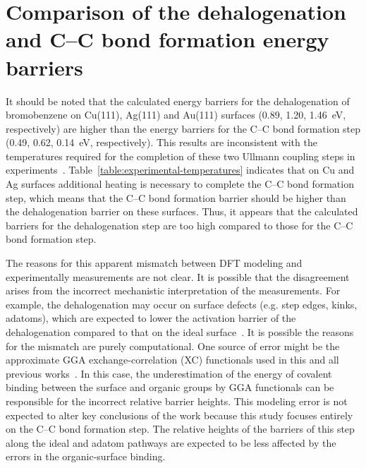 \documentclass[journal=jpclcd,layout=traditional,manuscript=letter]{achemso} %
\begin{document}
\section{Comparison of the dehalogenation and C--C bond formation energy barriers}

It should be noted that the calculated energy barriers for the dehalogenation of bromobenzene on Cu(111), Ag(111) and Au(111) surfaces (0.89, 1.20, \SI{1.46}{\electronvolt}, respectively) are higher than the energy barriers for the C--C bond formation step (0.49, 0.62, \SI{0.14}{\electronvolt}, respectively). This results are inconsistent with the temperatures required for the completion of these two Ullmann coupling steps in experiments~\cite{sur_sci01, sur_sci02, sur_sci03, ullmann_52, ullmann_68, ullmann_69, ullmann_88, ullmann_98}. Table~\ref{table:experimental-temperatures} indicates that on Cu and Ag surfaces additional heating is necessary to complete the C--C bond formation step, which means that the C--C bond formation barrier should be higher than the dehalogenation barrier on these surfaces. Thus, it appears that the calculated barriers for the dehalogenation step are too high compared to those for the C--C bond formation step.

The reasons for this apparent mismatch between DFT modeling and experimentally measurements are not clear. It is possible that the disagreement arises from the incorrect mechanistic interpretation of the measurements. For example, the dehalogenation may occur on surface defects (e.g. step edges, kinks, adatoms), which are expected to lower the activation barrier of the dehalogenation compared to that on the ideal surface~\cite{chemeurope2017}. It is possible the reasons for the mismatch are purely computational. One source of error might be the approximate GGA exchange-correlation (XC) functionals used in this and all previous works~\cite{jacs2013, pccp2010}. In this case, the underestimation of the energy of covalent binding between the surface and organic groups by GGA functionals can be responsible for the incorrect relative barrier heights. This modeling error is not expected to alter key conclusions of the work because this study focuses entirely on the  C--C bond formation step. The relative heights of the barriers of this step along the ideal and adatom pathways are expected to be less affected by the errors in the organic-surface binding.
\end{document}
